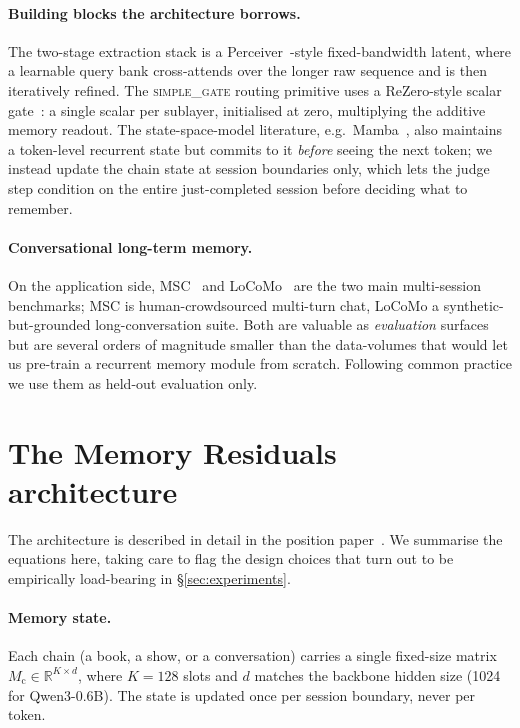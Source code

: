\documentclass{article}
\newcommand{\Mc}{M_{\text{c}}}
\begin{document}
\paragraph{Building blocks the architecture borrows.} The two-stage
extraction stack is a Perceiver~\cite{jaegle2021perceiver}-style
fixed-bandwidth latent, where a learnable query bank cross-attends
over the longer raw sequence and is then iteratively refined. The
\textsc{simple\_gate} routing primitive uses a ReZero-style scalar
gate~\cite{bachlechner2021rezero}: a single scalar per sublayer,
initialised at zero, multiplying the additive memory readout. The
state-space-model literature, e.g.\ Mamba~\cite{gu2023mamba}, also
maintains a token-level recurrent state but commits to it
\emph{before} seeing the next token; we instead update the chain
state at session boundaries only, which lets the judge step
condition on the entire just-completed session before deciding
what to remember.

\paragraph{Conversational long-term memory.}
On the application side, MSC~\cite{xu2022msc} and
LoCoMo~\cite{maharana2024locomo} are the two main multi-session
benchmarks; MSC is human-crowdsourced multi-turn chat, LoCoMo a
synthetic-but-grounded long-conversation suite. Both are valuable as
\emph{evaluation} surfaces but are several orders of magnitude
smaller than the data-volumes that would let us pre-train a
recurrent memory module from scratch. Following common practice we
use them as held-out evaluation only.

\section{The Memory Residuals architecture}
\label{sec:method}

The architecture is described in detail in the position
paper~\cite{liu2025memres}. We summarise the equations here, taking
care to flag the design choices that turn out to be empirically
load-bearing in \S\ref{sec:experiments}.

\paragraph{Memory state.} Each chain (a book, a show, or a
conversation) carries a single fixed-size matrix
$\Mc \in \mathbb{R}^{K \times d}$, where $K = 128$ slots and $d$
matches the backbone hidden size (1024 for Qwen3-0.6B). The state is
updated once per session boundary, never per token.
\end{document}
